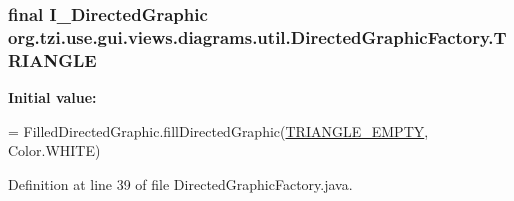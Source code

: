 \hypertarget{classorg_1_1tzi_1_1use_1_1gui_1_1views_1_1diagrams_1_1util_1_1_directed_graphic_factory_a228962e57425c1c1b379ba067afca635}{
\subsubsection[{T\-R\-I\-A\-N\-G\-L\-E}]{\setlength{\rightskip}{0pt plus 5cm}final {\bf I\-\_\-\-Directed\-Graphic} org.\-tzi.\-use.\-gui.\-views.\-diagrams.\-util.\-Directed\-Graphic\-Factory.\-T\-R\-I\-A\-N\-G\-L\-E\hspace{0.3cm}{\ttfamily [static]}}}\label{classorg_1_1tzi_1_1use_1_1gui_1_1views_1_1diagrams_1_1util_1_1_directed_graphic_factory_a228962e57425c1c1b379ba067afca635}
{\bfseries Initial value\-:}
\begin{DoxyCode}
=
            FilledDirectedGraphic.fillDirectedGraphic(\hyperlink{classorg_1_1tzi_1_1use_1_1gui_1_1views_1_1diagrams_1_1util_1_1_directed_graphic_factory_adce0f23df7d8c62ba8a1a1259d500f2d}{TRIANGLE\_EMPTY}, Color.WHITE)
\end{DoxyCode}


Definition at line 39 of file Directed\-Graphic\-Factory.\-java.

